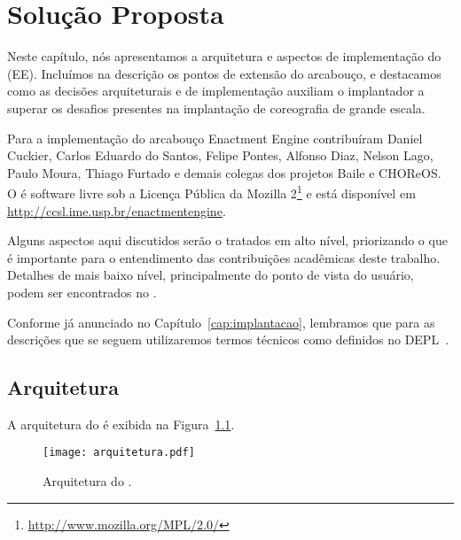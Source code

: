 \chapter{Solução Proposta}
\label{cap:solucao}


Neste capítulo, nós apresentamos a arquitetura e aspectos de implementação do \choreos \ee (EE).   
Incluímos na descrição os pontos de extensão do arcabouço, e destacamos
como as decisões arquiteturais e de implementação auxiliam o implantador
a superar os desafios presentes na implantação de coreografia de grande escala.

Para a implementação do arcabouço Enactment Engine contribuíram Daniel Cuckier, Carlos Eduardo do Santos, Felipe Pontes, Alfonso Diaz, Nelson Lago, Paulo Moura, Thiago Furtado e demais colegas dos projetos Baile e CHOReOS. O \ee é software livre 
sob a Licença Pública da Mozilla 2\footnote{\url{http://www.mozilla.org/MPL/2.0/}} 
e está disponível em \url{http://ccsl.ime.usp.br/enactmentengine}. 

Alguns aspectos aqui discutidos serão o tratados em alto nível,
priorizando o que é importante para o entendimento das contribuições
acadêmicas deste trabalho.
Detalhes de mais baixo nível, principalmente do ponto de vista do
usuário, podem ser encontrados no \userguide.

Conforme já anunciado no Capítulo~\ref{cap:implantacao},
lembramos que para as descrições que se seguem utilizaremos
termos técnicos como definidos no DEPL~\cite{DEPL2006}.

\section{Arquitetura}

A arquitetura do \ee é exibida na Figura~\ref{fig:arquitetura}.

\begin{figure}[ht]
\centering
\texttt{[image: arquitetura.pdf]}
\caption{Arquitetura do \choreos \ee.}
\label{fig:arquitetura}
\end{figure}

